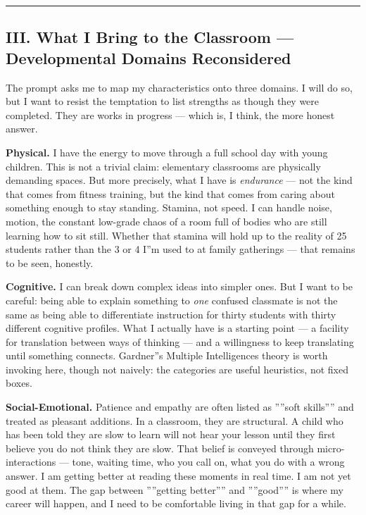\documentclass[12pt,a4paper]{article}
\begin{document}
\begin{center}
\rule{0.5\textwidth}{0.4pt}
\end{center}

\subsection{III. What I Bring to the Classroom --- Developmental Domains Reconsidered}

The prompt asks me to map my characteristics onto three domains. I will do so, but I want to resist the temptation to list strengths as though they were completed. They are works in progress --- which is, I think, the more honest answer.

\textbf{Physical.} I have the energy to move through a full school day with young children. This is not a trivial claim: elementary classrooms are physically demanding spaces. But more precisely, what I have is \emph{endurance} --- not the kind that comes from fitness training, but the kind that comes from caring about something enough to stay standing. Stamina, not speed. I can handle noise, motion, the constant low-grade chaos of a room full of bodies who are still learning how to sit still. Whether that stamina will hold up to the reality of 25 students rather than the 3 or 4 I''m used to at family gatherings --- that remains to be seen, honestly.

\textbf{Cognitive.} I can break down complex ideas into simpler ones. But I want to be careful: being able to explain something to \emph{one} confused classmate is not the same as being able to differentiate instruction for thirty students with thirty different cognitive profiles. What I actually have is a starting point --- a facility for translation between ways of thinking --- and a willingness to keep translating until something connects. Gardner''s Multiple Intelligences theory is worth invoking here, though not naively: the categories are useful heuristics, not fixed boxes.

\textbf{Social-Emotional.} Patience and empathy are often listed as ''''soft skills'''' and treated as pleasant additions. In a classroom, they are structural. A child who has been told they are slow to learn will not hear your lesson until they first believe you do not think they are slow. That belief is conveyed through micro-interactions --- tone, waiting time, who you call on, what you do with a wrong answer. I am getting better at reading these moments in real time. I am not yet good at them. The gap between ''''getting better'''' and ''''good'''' is where my career will happen, and I need to be comfortable living in that gap for a while.
\end{document}
